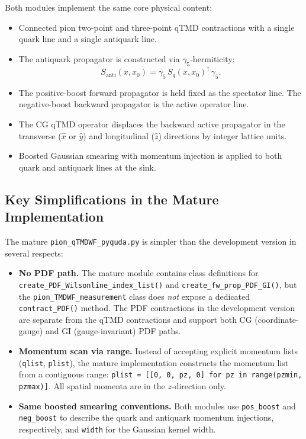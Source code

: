 \documentclass[11pt]{article}
\begin{document}
Both modules implement the same core physical content:
\begin{itemize}
    \item Connected pion two-point and three-point qTMD contractions with a single quark line and a single antiquark line.
    \item The antiquark propagator is constructed via $\gamma_5$-hermiticity:
    \begin{equation}
        S_{\text{anti}}(x, x_0) = \gamma_5 \, S_q(x, x_0)^\dagger \, \gamma_5.
    \end{equation}
    \item The positive-boost forward propagator is held fixed as the spectator
    line. The negative-boost backward propagator is the active operator line.
    \item The CG qTMD operator displaces the backward active propagator in the
    transverse ($\hat{x}$ or $\hat{y}$) and longitudinal ($\hat{z}$)
    directions by integer lattice units.
    \item Boosted Gaussian smearing with momentum injection is applied to both quark and antiquark lines at the sink.
\end{itemize}

\subsection{Key Simplifications in the Mature Implementation}

The mature \texttt{pion\_qTMDWF\_pyquda.py} is simpler than the development version in several respects:
\begin{itemize}
    \item \textbf{No PDF path.} The mature module contains class definitions for \texttt{create\_PDF\_Wilsonline\_index\_list()} and \texttt{create\_fw\_prop\_PDF\_GI()}, but the \texttt{pion\_TMDWF\_measurement} class does \emph{not} expose a dedicated \texttt{contract\_PDF()} method. The PDF contractions in the development version are separate from the qTMD contractions and support both CG (coordinate-gauge) and GI (gauge-invariant) PDF paths.
    \item \textbf{Momentum scan via range.} Instead of accepting explicit momentum lists (\texttt{qlist}, \texttt{plist}), the mature implementation constructs the momentum list from a contiguous range: \texttt{plist = [[0, 0, pz, 0] for pz in range(pzmin, pzmax)]}. All spatial momenta are in the $z$-direction only.
    \item \textbf{Same boosted smearing conventions.} Both modules use \texttt{pos\_boost} and \texttt{neg\_boost} to describe the quark and antiquark momentum injections, respectively, and \texttt{width} for the Gaussian kernel width.
\end{itemize}
\end{document}
